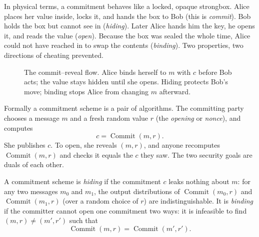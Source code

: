 \begin{intuitionbox}
In physical terms, a commitment behaves like a locked, opaque strongbox. Alice places her value inside, locks it, and hands the box to Bob (this is \emph{commit}). Bob holds the box but cannot see in (\emph{hiding}). Later Alice hands him the key, he opens it, and reads the value (\emph{open}). Because the box was sealed the whole time, Alice could not have reached in to swap the contents (\emph{binding}). Two properties, two directions of cheating prevented.
\end{intuitionbox}

\begin{figure}[H]
\centering
{}
\caption{The commit--reveal flow. Alice binds herself to $m$ with $c$ before Bob acts; the value stays hidden until she opens. Hiding protects Bob's move; binding stops Alice from changing $m$ afterward.}
\label{ch32:fig-flow}
\end{figure}

Formally a commitment scheme is a pair of algorithms. The committing party chooses a message $m$ and a fresh random value $r$ (the \emph{opening} or \emph{nonce}), and computes
\[
  c = \operatorname{Commit}(m, r).
\]
She publishes $c$. To open, she reveals $(m, r)$, and anyone recomputes $\operatorname{Commit}(m,r)$ and checks it equals the $c$ they saw. The two security goals are duals of each other.

\begin{definition}
\label{ch32:hidingbinding}
A commitment scheme is \emph{hiding} if the commitment $c$ leaks nothing about $m$: for any two messages $m_0$ and $m_1$, the output distributions of $\operatorname{Commit}(m_0, r)$ and $\operatorname{Commit}(m_1, r)$ (over a random choice of $r$) are indistinguishable. It is \emph{binding} if the committer cannot open one commitment two ways: it is infeasible to find $(m, r) \neq (m', r')$ such that
\[
  \operatorname{Commit}(m, r) = \operatorname{Commit}(m', r').
\]
\end{definition}

